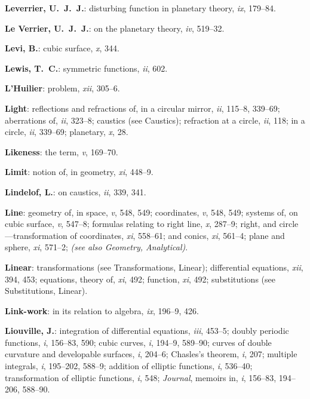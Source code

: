 \documentclass[11pt,a4paper]{article}
\newcommand{\IndexEntry}[1]{\textbf{#1}}
\newcommand{\SeeAlso}[1]{\textit{(see also #1)}}
\newcommand{\V}[1]{\textit{#1}} %
\begin{document}
\IndexEntry{Leverrier, U.\ J.\ J.}: disturbing function in planetary theory, \V{ix}, 179--84.

\IndexEntry{Le Verrier, U.\ J.\ J.}: on the planetary theory, \V{iv}, 519--32.

\IndexEntry{Levi, B.}: cubic surface, \V{x}, 344.

\IndexEntry{Lewis, T.\ C.}: symmetric functions, \V{ii}, 602.

\IndexEntry{L'Huilier}: problem, \V{xii}, 305--6.

\IndexEntry{Light}: reflections and refractions of, in a circular mirror, \V{ii}, 115--8, 339--69; aberrations of, \V{ii}, 323--8; caustics (see Caustics); refraction at a circle, \V{ii}, 118; in a circle, \V{ii}, 339--69; planetary, \V{x}, 28.

\IndexEntry{Likeness}: the term, \V{v}, 169--70.

\IndexEntry{Limit}: notion of, in geometry, \V{xi}, 448--9.

\IndexEntry{Lindelof, L.}: on caustics, \V{ii}, 339, 341.

\IndexEntry{Line}: geometry of, in space, \V{v}, 548, 549; coordinates, \V{v}, 548, 549; systems of, on cubic surface, \V{v}, 547--8; formulas relating to right line, \V{x}, 287--9; right, and circle---transformation of coordinates, \V{xi}, 558--61; and conics, \V{xi}, 561--4; plane and sphere, \V{xi}, 571--2; \SeeAlso{Geometry, Analytical}.

\IndexEntry{Linear}: transformations (see Transformations, Linear); differential equations, \V{xii}, 394, 453; equations, theory of, \V{xi}, 492; function, \V{xi}, 492; substitutions (see Substitutions, Linear).

\IndexEntry{Link-work}: in its relation to algebra, \V{ix}, 196--9, 426.

\newpage

\setcounter{page}{110}

\IndexEntry{Liouville, J.}: integration of differential equations, \V{iii}, 453--5; doubly periodic functions, \V{i}, 156--83, 590; cubic curves, \V{i}, 194--9, 589--90; curves of double curvature and developable surfaces, \V{i}, 204--6; Chasles's theorem, \V{i}, 207; multiple integrals, \V{i}, 195--202, 588--9; addition of elliptic functions, \V{i}, 536--40; transformation of elliptic functions, \V{i}, 548; \textit{Journal}, memoirs in, \V{i}, 156--83, 194--206, 588--90.
\end{document}
